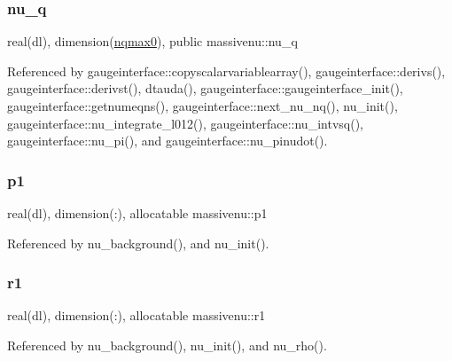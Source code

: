 \subsubsection{\texorpdfstring{nu\+\_\+q}{nu\_q}}
{\footnotesize\ttfamily real(dl), dimension(\mbox{\hyperlink{namespacemassivenu_ae4e7d71c09007f613d462d593de26cca}{nqmax0}}), public massivenu\+::nu\+\_\+q}



Referenced by gaugeinterface\+::copyscalarvariablearray(), gaugeinterface\+::derivs(), gaugeinterface\+::derivst(), dtauda(), gaugeinterface\+::gaugeinterface\+\_\+init(), gaugeinterface\+::getnumeqns(), gaugeinterface\+::next\+\_\+nu\+\_\+nq(), nu\+\_\+init(), gaugeinterface\+::nu\+\_\+integrate\+\_\+l012(), gaugeinterface\+::nu\+\_\+intvsq(), gaugeinterface\+::nu\+\_\+pi(), and gaugeinterface\+::nu\+\_\+pinudot().

\mbox{\label{namespacemassivenu_a1776e9b553839aa3e0328f3104c8def6}} 
\subsubsection{\texorpdfstring{p1}{p1}}
{\footnotesize\ttfamily real(dl), dimension(\+:), allocatable massivenu\+::p1\hspace{0.3cm}{\ttfamily [private]}}



Referenced by nu\+\_\+background(), and nu\+\_\+init().

\mbox{\label{namespacemassivenu_a17286610cbb3be4f5e2e6cb9207cd3d3}} 
\subsubsection{\texorpdfstring{r1}{r1}}
{\footnotesize\ttfamily real(dl), dimension(\+:), allocatable massivenu\+::r1\hspace{0.3cm}{\ttfamily [private]}}



Referenced by nu\+\_\+background(), nu\+\_\+init(), and nu\+\_\+rho().

\mbox{\label{namespacemassivenu_a51e0c61eba59c96a5b43e2d0c8eacd6f}} 
